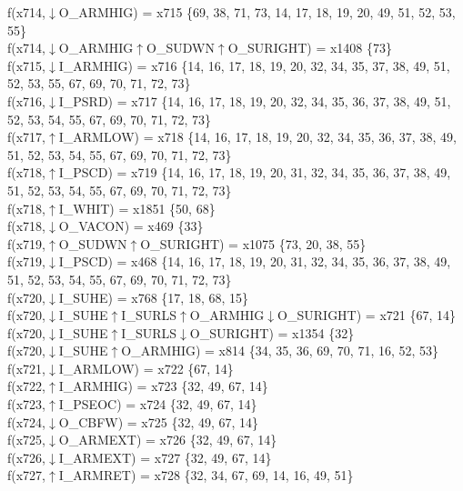 f(x714,$\downarrow$O\_ARMHIG) = x715 \{69, 38, 71, 73, 14, 17, 18, 19, 20, 49, 51, 52, 53, 55\} \\  
f(x714,$\downarrow$O\_ARMHIG$\uparrow$O\_SUDWN$\uparrow$O\_SURIGHT) = x1408 \{73\} \\  
f(x715,$\downarrow$I\_ARMHIG) = x716 \{14, 16, 17, 18, 19, 20, 32, 34, 35, 37, 38, 49, 51, 52, 53, 55, 67, 69, 70, 71, 72, 73\} \\  
f(x716,$\downarrow$I\_PSRD) = x717 \{14, 16, 17, 18, 19, 20, 32, 34, 35, 36, 37, 38, 49, 51, 52, 53, 54, 55, 67, 69, 70, 71, 72, 73\} \\  
f(x717,$\uparrow$I\_ARMLOW) = x718 \{14, 16, 17, 18, 19, 20, 32, 34, 35, 36, 37, 38, 49, 51, 52, 53, 54, 55, 67, 69, 70, 71, 72, 73\} \\  
f(x718,$\uparrow$I\_PSCD) = x719 \{14, 16, 17, 18, 19, 20, 31, 32, 34, 35, 36, 37, 38, 49, 51, 52, 53, 54, 55, 67, 69, 70, 71, 72, 73\} \\  
f(x718,$\uparrow$I\_WHIT) = x1851 \{50, 68\} \\  
f(x718,$\downarrow$O\_VACON) = x469 \{33\} \\  
f(x719,$\uparrow$O\_SUDWN$\uparrow$O\_SURIGHT) = x1075 \{73, 20, 38, 55\} \\  
f(x719,$\downarrow$I\_PSCD) = x468 \{14, 16, 17, 18, 19, 20, 31, 32, 34, 35, 36, 37, 38, 49, 51, 52, 53, 54, 55, 67, 69, 70, 71, 72, 73\} \\  
f(x720,$\downarrow$I\_SUHE) = x768 \{17, 18, 68, 15\} \\  
f(x720,$\downarrow$I\_SUHE$\uparrow$I\_SURLS$\uparrow$O\_ARMHIG$\downarrow$O\_SURIGHT) = x721 \{67, 14\} \\  
f(x720,$\downarrow$I\_SUHE$\uparrow$I\_SURLS$\downarrow$O\_SURIGHT) = x1354 \{32\} \\  
f(x720,$\downarrow$I\_SUHE$\uparrow$O\_ARMHIG) = x814 \{34, 35, 36, 69, 70, 71, 16, 52, 53\} \\  
f(x721,$\downarrow$I\_ARMLOW) = x722 \{67, 14\} \\  
f(x722,$\uparrow$I\_ARMHIG) = x723 \{32, 49, 67, 14\} \\  
f(x723,$\uparrow$I\_PSEOC) = x724 \{32, 49, 67, 14\} \\  
f(x724,$\downarrow$O\_CBFW) = x725 \{32, 49, 67, 14\} \\  
f(x725,$\downarrow$O\_ARMEXT) = x726 \{32, 49, 67, 14\} \\  
f(x726,$\downarrow$I\_ARMEXT) = x727 \{32, 49, 67, 14\} \\  
f(x727,$\uparrow$I\_ARMRET) = x728 \{32, 34, 67, 69, 14, 16, 49, 51\} \\  
